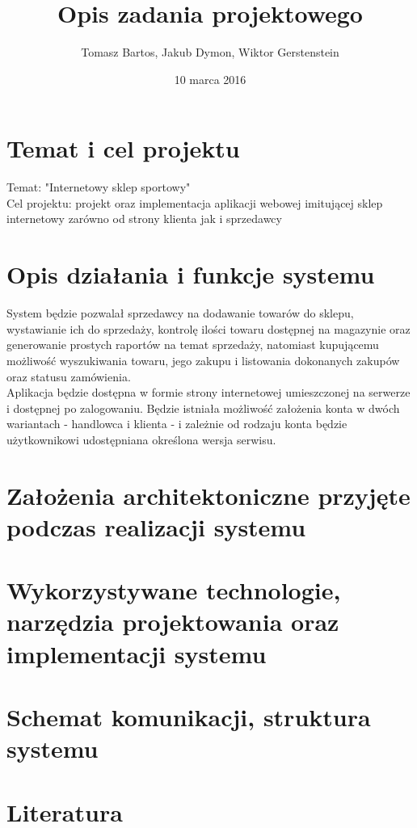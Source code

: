 \documentclass[a4paper, 11pt]{article}
\title{Opis zadania projektowego}
\author{Tomasz Bartos, Jakub Dymon, Wiktor Gerstenstein}
\date{10 marca 2016}
\begin{document}
\maketitle
\section{Temat i cel projektu}
Temat: "Internetowy sklep sportowy"\\
Cel projektu: projekt oraz implementacja aplikacji webowej imitującej sklep internetowy zarówno od strony klienta jak i sprzedawcy
\section{Opis działania i funkcje systemu}
System będzie pozwalał sprzedawcy na dodawanie towarów do sklepu, wystawianie ich do sprzedaży, kontrolę ilości towaru dostępnej na magazynie oraz generowanie prostych raportów na temat sprzedaży, natomiast kupującemu możliwość wyszukiwania towaru, jego zakupu i listowania dokonanych zakupów oraz statusu zamówienia.\\
Aplikacja będzie dostępna w formie strony internetowej umieszczonej na serwerze i dostępnej po zalogowaniu. Będzie istniała możliwość założenia konta w dwóch wariantach - handlowca i klienta - i zależnie od rodzaju konta będzie użytkownikowi udostępniana określona wersja serwisu.
\section{Założenia architektoniczne przyjęte podczas realizacji systemu}
\section{Wykorzystywane technologie, narzędzia projektowania oraz implementacji systemu}
\section{Schemat komunikacji, struktura systemu}
\section{Literatura}
\end{document}
